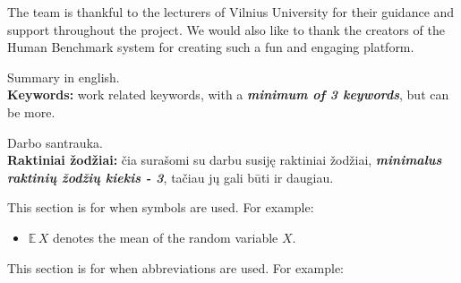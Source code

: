 \documentclass[]{VUMIFTemplateClass}
\newcommand{\EE}{\mathbb{E}\,} %
\begin{document}

\onehalfspacing


The team is thankful to the lecturers of Vilnius University for their guidance and support throughout the project. We would also like to thank the creators of the Human Benchmark system for creating such a fun and engaging platform.




Summary in english.\\

\textbf{Keywords:} work related keywords, with a \textit{\textbf{minimum of 3 keywords}}, but can be more.


Darbo santrauka.\\

\textbf{Raktiniai žodžiai:} čia surašomi su darbu susiję raktiniai žodžiai, \textit{\textbf{minimalus raktinių žodžių kiekis - 3}}, tačiau jų gali būti ir daugiau.




\singlespacing
{}
\listoffigures 

\listoftables

\tableofcontents
\onehalfspacing


This section is for when symbols are used. For example:
\begin{itemize}
    \item $\EE X$ denotes the mean of the random variable $X$.
\end{itemize}


This section is for when abbreviations are used. For example:
\end{document}
